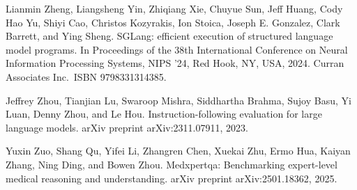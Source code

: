 Lianmin Zheng, Liangsheng Yin, Zhiqiang Xie, Chuyue Sun, Jeff Huang, Cody
Hao Yu, Shiyi Cao, Christos Kozyrakis, Ion Stoica, Joseph E. Gonzalez,
Clark Barrett, and Ying Sheng. SGLang: efficient execution of structured
language model programs. In Proceedings of the 38th International
Conference on Neural Information Processing Systems, NIPS '24, Red Hook,
NY, USA, 2024. Curran Associates Inc.~ISBN 9798331314385.

Jeffrey Zhou, Tianjian Lu, Swaroop Mishra, Siddhartha Brahma, Sujoy Basu,
Yi Luan, Denny Zhou, and Le Hou. Instruction-following evaluation for
large language models. arXiv preprint arXiv:2311.07911, 2023.

Yuxin Zuo, Shang Qu, Yifei Li, Zhangren Chen, Xuekai Zhu, Ermo Hua,
Kaiyan Zhang, Ning Ding, and Bowen Zhou. Medxpertqa: Benchmarking
expert-level medical reasoning and understanding. arXiv preprint
arXiv:2501.18362, 2025.
